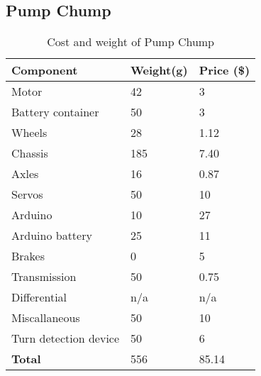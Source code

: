 \documentclass[class=../../report, crop=false]{standalone}
\newcommand{\weight}[1]{
	\cellcolor{blue!10}#1
}
\newcommand{\cost}[1]{
	\cellcolor{green!10}#1
}
\newcommand{\total}[1]{
	\cellcolor{green!25}#1
}
\begin{document}
\subsection{Pump Chump}
\begin{table}[H]
	\centering
	\begin{tabular}{| l | l | l|}
		\hline
		\textbf{Component} & \textbf{Weight(g)} & \textbf{Price (\$)}\\ \hline
		Motor					& \weight{42}	& \cost{3}		\\ \hline
		Battery container		& \weight{50}	& \cost{3}		\\ \hline
		Wheels					& \weight{28}	& \cost{1.12}	\\ \hline
		Chassis					& \weight{185}	& \cost{7.40}	\\ \hline
		Axles					& \weight{16}	& \cost{0.87}	\\ \hline
		Servos					& \weight{50}	& \cost{10}		\\ \hline
		Arduino					& \weight{10}	& \cost{27}		\\ \hline
		Arduino battery			& \weight{25}	& \cost{11}		\\ \hline
		Brakes					& \weight{0}	& \cost{5}		\\ \hline
		Transmission			& \weight{50}	& \cost{0.75}	\\ \hline
		Differential			& \weight{n/a}	& \cost{n/a}	\\ \hline
		Miscallaneous			& \weight{50}	& \cost{10}		\\ \hline
		Turn detection device	& \weight{50}	& \cost{6}		\\ \hline
		\total{\textbf{Total}} 	& \total{556}	& \total{85.14}	\\ \hline
	\end{tabular}
	\caption{Cost and weight of Pump Chump}
\end{table}
\end{document}
